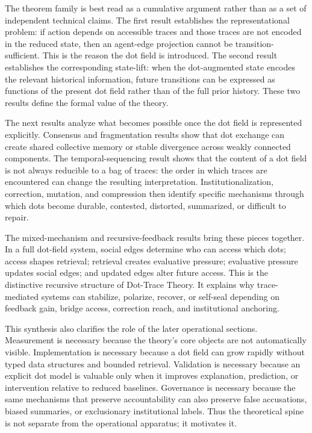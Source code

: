 \documentclass[11pt]{article}
\theoremstyle{remark}
\begin{document}
The theorem family is best read as a cumulative argument rather than as a set of independent technical claims. The first result establishes the representational problem: if action depends on accessible traces and those traces are not encoded in the reduced state, then an agent-edge projection cannot be transition-sufficient. This is the reason the dot field is introduced. The second result establishes the corresponding state-lift: when the dot-augmented state encodes the relevant historical information, future transitions can be expressed as functions of the present dot field rather than of the full prior history. These two results define the formal value of the theory.

The next results analyze what becomes possible once the dot field is represented explicitly. Consensus and fragmentation results show that dot exchange can create shared collective memory or stable divergence across weakly connected components. The temporal-sequencing result shows that the content of a dot field is not always reducible to a bag of traces: the order in which traces are encountered can change the resulting interpretation. Institutionalization, correction, mutation, and compression then identify specific mechanisms through which dots become durable, contested, distorted, summarized, or difficult to repair.

The mixed-mechanism and recursive-feedback results bring these pieces together. In a full dot-field system, social edges determine who can access which dots; access shapes retrieval; retrieval creates evaluative pressure; evaluative pressure updates social edges; and updated edges alter future access. This is the distinctive recursive structure of Dot-Trace Theory. It explains why trace-mediated systems can stabilize, polarize, recover, or self-seal depending on feedback gain, bridge access, correction reach, and institutional anchoring.

This synthesis also clarifies the role of the later operational sections. Measurement is necessary because the theory's core objects are not automatically visible. Implementation is necessary because a dot field can grow rapidly without typed data structures and bounded retrieval. Validation is necessary because an explicit dot model is valuable only when it improves explanation, prediction, or intervention relative to reduced baselines. Governance is necessary because the same mechanisms that preserve accountability can also preserve false accusations, biased summaries, or exclusionary institutional labels. Thus the theoretical spine is not separate from the operational apparatus; it motivates it.
\end{document}
